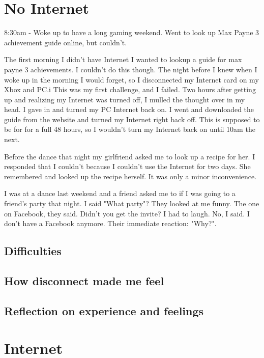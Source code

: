 \documentclass[12pt,letterpaper]{article}
\begin{document}
\section{No Internet}
8:30am - Woke up to have a long gaming weekend. Went to look up Max
Payne 3 achievement guide online, but couldn't.

The first morning I didn't have Internet I wanted to lookup a guide for
max payne 3 achievements. I couldn't do this though. The night before I
knew when I woke up in the morning I would forget, so I disconnected my
Internet card on my Xbox and PC.i This was my first challenge, and I
failed. Two hours after getting up and realizing my Internet was turned
off, I mulled the thought over in my head.  I gave in and turned my PC
Internet back on. I went and downloaded the guide from the website and
turned my Internet right back off. This is supposed to be for for a full
48 hours, so I wouldn't turn my Internet back on until 10am the next.


Before the dance that night my girlfriend asked me to look up a recipe
for her. I responded that I couldn't because I couldn't use the Internet
for two days. She remembered and looked up the recipe herself. It was
only a minor inconvenience.


I was at a dance last weekend and a friend asked me to if I was
going to a friend's party that night. I said "What party"? They looked
at me funny. The one on Facebook, they said. Didn't you get the invite?
I had to laugh. No, I said. I don't have a Facebook anymore. Their
immediate reaction: "Why?".





\subsection{Difficulties}
\subsection{How disconnect made me feel}
\subsection{Reflection on experience and feelings}


\section{Internet}
\end{document}
